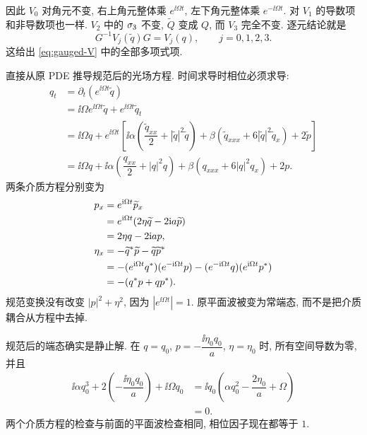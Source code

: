 因此 $V_0$ 对角元不变, 右上角元整体乘 $e^{\ii\Omega t}$, 左下角元整体乘 $e^{-\ii\Omega t}$. 对 $V_1$ 的导数项和非导数项也一样. $V_2$ 中的 $\sigma_3$ 不变, $\widetilde Q$ 变成 $Q$, 而 $V_3$ 完全不变. 逐元结论就是
\begin{equation*}
G^{-1}V_j(\widetilde q)G=V_j(q),
\qquad j=0,1,2,3.
\end{equation*}
这给出 \eqref{eq:gauged-V} 中的全部多项式项.
\par\smallskip\noindent 直接从原 PDE 推导规范后的光场方程.\quad
时间求导时相位必须求导:
\begin{align*}
q_t
&=\partial_t(e^{\ii\Omega t}\widetilde q)\\
&=\ii\Omega e^{\ii\Omega t}\widetilde q
+e^{\ii\Omega t}\widetilde q_t\\
&=\ii\Omega q
+e^{\ii\Omega t}\left[
\ii\alpha\left(\dfrac{\widetilde q_{xx}}{2}
+|\widetilde q|^2\widetilde q\right)
+\beta(\widetilde q_{xxx}
+6|\widetilde q|^2\widetilde q_x)
+2\widetilde p\right]\\
&=\ii\Omega q
+\ii\alpha\left(\dfrac{q_{xx}}{2}+|q|^2q\right)
+\beta(q_{xxx}+6|q|^2q_x)+2p.
\end{align*}
两条介质方程分别变为
\begin{align*}
p_x
&=e^{\mathrm{i}\Omega t}\widetilde p_x\\
&=e^{\mathrm{i}\Omega t}
(2\eta\widetilde q-2\mathrm{i} a\widetilde p)\\
&=2\eta q-2\mathrm{i} ap,\\
\eta_x
&=-{\widetilde q}^{*}\widetilde p
-\widetilde q{\widetilde p}^{*}\\
&=-(e^{\mathrm{i}\Omega t}{q}^{*})(e^{-\mathrm{i}\Omega t}p)
-(e^{-\mathrm{i}\Omega t}q)(e^{\mathrm{i}\Omega t}{p}^{*})\\
&=-({q}^{*} p+q{p}^{*}).
\end{align*}
规范变换没有改变 $|p|^2+\eta^2$, 因为 $|e^{\ii\Omega t}|=1$. 原平面波被变为常端态, 而不是把介质耦合从方程中去掉.
\par\smallskip\noindent 规范后的端态确实是静止解.\quad
在 $q=q_0$, $p=-\dfrac{\ii\eta_0q_0}{a}$, $\eta=\eta_0$ 时, 所有空间导数为零, 并且
\begin{align*}
\ii\alpha q_0^3+2\left(-\dfrac{\ii\eta_0q_0}{a}\right)
+\ii\Omega q_0
&=\ii q_0\left(\alpha q_0^2-\dfrac{2\eta_0}{a}+\Omega\right)\\
&=0.
\end{align*}
两个介质方程的检查与前面的平面波检查相同, 相位因子现在都等于 $1$.

